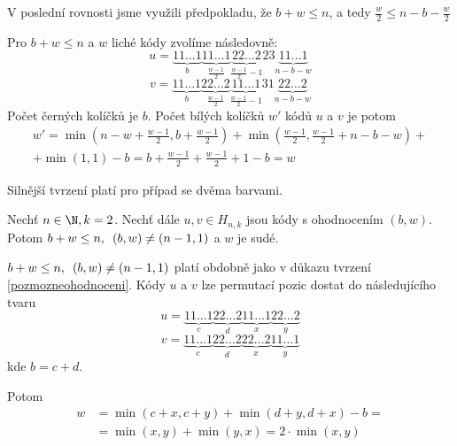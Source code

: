 \begin{dukaz}
V poslední rovnosti jsme využili předpokladu, že $b+w \leq n$, a tedy $\frac{w}{2} \leq n - b - \frac{w}{2}$

Pro $b+w \leq n$ a $w$ liché kódy zvolíme následovně:
\[
  u = 
    \underbrace{11\dots1}_{b}
    \underbrace{11\dots1}_{\frac{w-1}{2}}
    \underbrace{22\dots2}_{\frac{w-1}{2}-1}
    2
    3
    \underbrace{11\dots1}_{n-b-w}
 \]
 \[
  v = 
    \underbrace{11\dots1}_{b}
    \underbrace{22\dots2}_{\frac{w-1}{2}}
    \underbrace{11\dots1}_{\frac{w-1}{2}-1}
    3
    1
    \underbrace{22\dots2}_{n-b-w}
 \]
Počet černých kolíčků je $b$. Počet bílých kolíčků $w'$ kódů $u$ a $v$ je potom
\begin{align*} 
w' = \min\left(n-w+\frac{w-1}{2}, b + \frac{w-1}{2}\right) + \min\left(\frac{w-1}{2}, \frac{w-1}{2} + n-b-w\right) + \\ +\min(1,1) - b 
 = b + \frac{w-1}{2} + \frac{w-1}{2} + 1 - b = w
\end{align*}
\end{dukaz}

Silnější tvrzení platí pro případ se dvěma barvami. 

\begin{tvrz}\label{pozohodnoceniprodvebarvy}
    Nechť $n \in \N, k=2$. Nechť dále $u, v \in H_{n,k}$ jsou kódy s ohodnocením $(b,w)$. Potom $b + w \leq n, \hspace{5px} (b,w) \neq (n-1,1)$ a $w$ je sudé.
\end{tvrz}
\begin{dukaz}
$b + w \leq n, \hspace{5px} (b,w) \neq (n-1,1)$ platí obdobně jako v důkazu tvrzení \ref{pozmozneohodnoceni}. Kódy $u$ a $v$ lze permutací pozic dostat do následujícího tvaru
    \[
  u = 
    \underbrace{11\dots1}_{c}
    \underbrace{22\dots2}_{d}
    \underbrace{11\dots1}_{x}
    \underbrace{22\dots2}_{y}
 \]
 \[
  v = 
    \underbrace{11\dots1}_{c}
    \underbrace{22\dots2}_{d}
    \underbrace{22\dots2}_{x}
    \underbrace{11\dots1}_{y}
 \]
 kde $b = c + d$. 

 Potom
 \begin{align*}
     w &= \min(c + x, c + y) + \min(d + y, d + x) - b =\\
     &= \min(x, y) + \min(y, x) = 2\cdot \min(x, y)
 \end{align*}

\end{dukaz}

